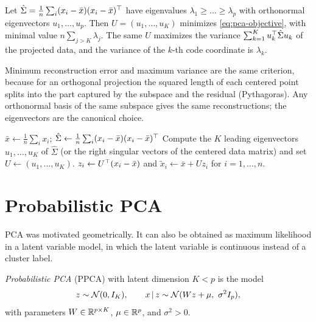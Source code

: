 \begin{proposition}\label{prop:pca}
Let $\hat\Sigma=\frac1n\sum_i(x_i-\bar x)(x_i-\bar x)^{\top}$ have eigenvalues $\lambda_1\ge\dots\ge\lambda_p$ with orthonormal eigenvectors $u_1,\dots,u_p$. Then $U=(u_1,\dots,u_K)$ minimizes \eqref{eq:pca-objective}, with minimal value $n\sum_{j>K}\lambda_j$. The same $U$ maximizes the variance $\sum_{k=1}^Ku_k^{\top}\hat\Sigma u_k$ of the projected data, and the variance of the $k$-th code coordinate is $\lambda_k$.
\end{proposition}

Minimum reconstruction error and maximum variance are the same criterion, because for an orthogonal projection the squared length of each centered point splits into the part captured by the subspace and the residual (Pythagoras). Any orthonormal basis of the same subspace gives the same reconstructions; the eigenvectors are the canonical choice.

\begin{algorithm}[H]
\caption{Principal Component Analysis (PCA)}\label{alg:pca}
\begin{algorithmic}[1]
\State $\bar x\gets\frac1n\sum_ix_i$; \quad $\hat\Sigma\gets\frac1n\sum_i(x_i-\bar x)(x_i-\bar x)^{\top}$
\State Compute the $K$ leading eigenvectors $u_1,\dots,u_K$ of $\hat\Sigma$ (or the right singular vectors of the centered data matrix) and set $U\gets(u_1,\dots,u_K)$.
\State $z_i\gets U^{\top}(x_i-\bar x)$ and $\tilde x_i\gets\bar x+Uz_i$ for $i=1,\dots,n$.
\end{algorithmic}
\end{algorithm}

\section{Probabilistic PCA}\label{sec:ppca}

PCA was motivated geometrically. It can also be obtained as maximum likelihood in a latent variable model, in which the latent variable is continuous instead of a cluster label.

\begin{definition}\label{def:ppca}
\emph{Probabilistic PCA} (PPCA) with latent dimension $K<p$ is the model
\[
z\sim\mathcal{N}(0,I_K),\qquad x\,|\, z\sim\mathcal{N}(Wz+\mu,\ \sigma^2I_p),
\]
with parameters $W\in\mathbb{R}^{p\times K}$, $\mu\in\mathbb{R}^p$, and $\sigma^2>0$.
\end{definition}

